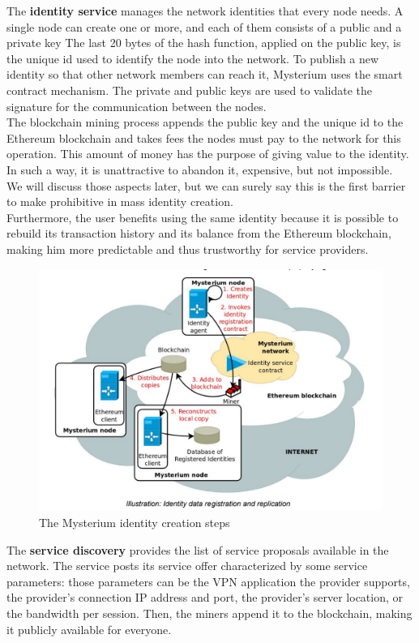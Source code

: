 \documentclass[]{article}
\begin{document}
	The \textbf{identity service} manages the network identities that every node needs. A single node can create one or more, and each of them consists of a public and a private key The last 20 bytes of the hash function, applied on the public key, is the unique id used to identify the node into the network. To publish a new identity so that other network members can reach it, Mysterium uses the smart contract mechanism. The private and public keys are used to validate the signature for the communication between the nodes.\\
	The blockchain mining process appends the public key and the unique id to the Ethereum blockchain and takes fees the nodes must pay to the network for this operation. This amount of money has the purpose of giving value to the identity. In such a way, it is unattractive to abandon it, expensive, but not impossible.\\ 
	We will discuss those aspects later, but we can surely say this is the first barrier to make prohibitive in mass identity creation.\\
	Furthermore, the user benefits using the same identity because it is possible to rebuild its transaction history and its balance from the Ethereum blockchain, making him more predictable and thus trustworthy for service providers.\\

	\begin{figure}
		\includegraphics[width=0.5\linewidth]{"images/mysterium_identity_creation.png"}
		\caption{The Mysterium identity creation steps}
	\end{figure}

	The \textbf{service discovery} provides the list of service proposals available in the network. The service posts its service offer characterized by some service parameters: those parameters can be the VPN application the provider supports, the provider's connection IP address and port, the provider's server location, or the bandwidth per session. Then, the miners append it to the blockchain, making it publicly available for everyone.\\
\end{document}
